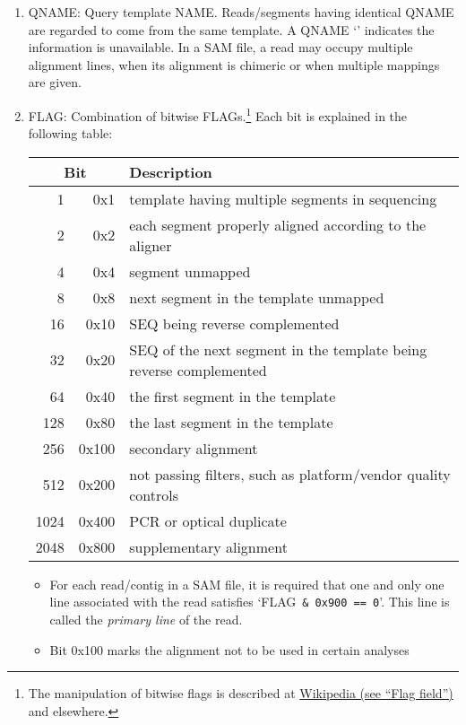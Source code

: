 \documentclass[10pt]{article}
\begin{document}
\begin{enumerate}
\item {\sf QNAME}: Query template NAME. Reads/segments having identical {\sf QNAME}
	are regarded to come from the same template. A {\sf QNAME} `{\tt *}'
	indicates the information is unavailable.  In a SAM file, a read may occupy
	multiple alignment lines, when its alignment is chimeric or when multiple
	mappings are given.
\item {\sf FLAG}: Combination of bitwise FLAGs.\footnote{The manipulation of
bitwise flags is described at \href{http://en.wikipedia.org/wiki/Flag\_field}
{Wikipedia (see ``Flag field'')} and elsewhere.}
Each bit is explained in the following table:
  \begin{center}\small
  \begin{tabular}{rrl}
  \hline
  \multicolumn{2}{c}{Bit} & Description\\
  \hline
    1 &    0x1 & template having multiple segments in sequencing \\
    2 &    0x2 & each segment properly aligned according to the aligner \\
    4 &    0x4 & segment unmapped \\
    8 &    0x8 & next segment in the template unmapped \\
   16 &   0x10 & {\sf SEQ} being reverse complemented \\
   32 &   0x20 & {\sf SEQ} of the next segment in the template being reverse complemented \\
   64 &   0x40 & the first segment in the template \\
  128 &   0x80 & the last segment in the template \\
  256 &  0x100 & secondary alignment \\
  512 &  0x200 & not passing filters, such as platform/vendor quality controls \\
 1024 &  0x400 & PCR or optical duplicate \\
 2048 &  0x800 & supplementary alignment \\
  \hline
  \end{tabular}
  \end{center}
  \begin{itemize}
  \item For each read/contig in a SAM file, it is required that one and only
	one line associated with the read satisfies \mbox{`{\sf FLAG} {\tt \& 0x900
	== 0}'}. This line is called the \emph{primary line} of the read.
  \item Bit 0x100 marks the alignment not to be used in certain analyses

\end{itemize}
\end{enumerate}
\end{document}

